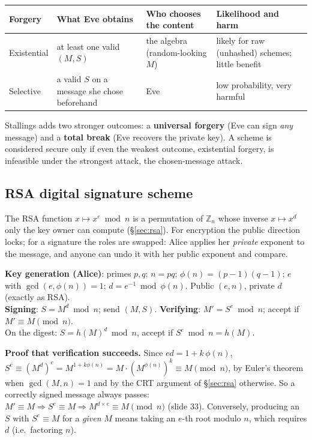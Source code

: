 \begin{center}\small
\begin{tabularx}{\textwidth}{@{}l X X X@{}}
\toprule
Forgery & What Eve obtains & Who chooses the content & Likelihood and harm\\
\midrule
Existential & at least one valid $(M, S)$ & the algebra (random-looking $M$) & likely for raw (unhashed) schemes; little benefit\\
Selective & a valid $S$ on a message she chose beforehand & Eve & low probability, very harmful\\
\bottomrule
\end{tabularx}
\end{center}
Stallings adds two stronger outcomes: a \textbf{universal forgery} (Eve can sign \emph{any} message) and a \textbf{total break} (Eve recovers the private key). A scheme is considered secure only if even the weakest outcome, existential forgery, is infeasible under the strongest attack, the chosen-message attack.

\subsection{RSA digital signature scheme \hot\new}

The RSA function $x \mapsto x^e \bmod n$ is a permutation of $\mathbb{Z}_n$ whose inverse $x \mapsto x^d$ only the key owner can compute (\S\ref{sec:rsa}). For encryption the public direction locks; for a signature the roles are swapped: Alice applies her \emph{private} exponent to the message, and anyone can undo it with her public exponent and compare.

\begin{mustknow}
\textbf{Key generation (Alice)}: primes $p, q$; $n = pq$; $\phi(n) = (p-1)(q-1)$; $e$ with $\gcd(e, \phi(n)) = 1$; $d = e^{-1} \bmod \phi(n)$. Public $(e, n)$, private $d$ (exactly as RSA).\\
\textbf{Signing}: $S = M^d \bmod n$; send $(M, S)$. \qquad \textbf{Verifying}: $M' = S^e \bmod n$; accept if $M' \equiv M \pmod n$.\\
On the digest: $S = h(M)^d \bmod n$, accept if $S^e \bmod n = h(M)$.
\end{mustknow}

\textbf{Proof that verification succeeds.} Since $ed = 1 + k\,\phi(n)$, $S^e \equiv (M^d)^e = M^{1 + k\phi(n)} = M \cdot (M^{\phi(n)})^k \equiv M \pmod n$, by Euler's theorem when $\gcd(M, n) = 1$ and by the CRT argument of \S\ref{sec:rsa} otherwise. So a correctly signed message always passes: $M' \equiv M \Rightarrow S^e \equiv M \Rightarrow M^{d \times e} \equiv M \pmod n$ (slide 33). Conversely, producing an $S$ with $S^e \equiv M$ for a \emph{given} $M$ means taking an $e$-th root modulo $n$, which requires $d$ (i.e.\ factoring $n$).


